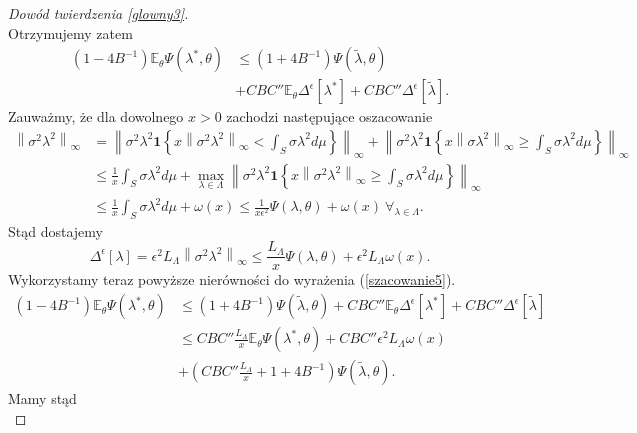 \documentclass[man,mfiu]{mgrwms}
\newcommand{\norm}[1]{\left\lVert#1\right\rVert}
\begin{document}
\begin{proof}[Dowód twierdzenia \ref{glowny3}]
\begin{displaymath}
\end{displaymath}
Otrzymujemy zatem
\begin{equation}\label{szacowanie5}
\begin{split}
(1-4B^{-1})\mathbb{E}_{\theta}\Psi(\lambda^*,\theta)&\leq (1+4B^{-1})\Psi(\tilde{\lambda},\theta) \\
&+CBC''\mathbb{E}_{\theta}\Delta^{\epsilon}[\lambda^*]+CBC''\Delta^{\epsilon}[\tilde{\lambda}].
\end{split}
\end{equation}
Zauważmy, że dla dowolnego $x>0$ zachodzi następujące oszacowanie
\begin{displaymath}
\begin{split}
\norm{\sigma^2\lambda^2}_{\infty}&=\norm{\sigma^2\lambda^2\pmb{1}\left\{x\norm{\sigma^2\lambda^2}_{\infty}<\int_S\sigma\lambda^2 d\mu\right\}}_{\infty}+\norm{\sigma^2\lambda^2\pmb{1}\left\{x\norm{\sigma\lambda^2}_{\infty}\geq \int_S\sigma\lambda^2 d\mu\right\}}_{\infty}\\
&\leq \frac{1}{x}\int_S\sigma\lambda^2 d\mu+\max_{\lambda\in \Lambda}\norm{\sigma^2\lambda^2\pmb{1}\left\{x\norm{\sigma^2\lambda^2}_{\infty}\geq \int_S\sigma\lambda^2 d\mu\right\}}_{\infty}\\
&\leq \frac{1}{x}\int_S\sigma\lambda^2 d\mu+\omega (x)\leq \frac{1}{x\epsilon^2}\Psi(\lambda,\theta)+\omega (x)\ \forall_{\lambda\in \Lambda}.
\end{split}
\end{displaymath}
Stąd dostajemy 
\begin{displaymath}
\Delta^{\epsilon}[\lambda]=\epsilon^2 L_{\Lambda}\norm{\sigma^2\lambda^2}_{\infty}\leq \frac{L_{\Lambda}}{x}\Psi(\lambda,\theta)+\epsilon^2L_{\Lambda}\omega (x).
\end{displaymath}
Wykorzystamy teraz powyższe nierówności do wyrażenia (\ref{szacowanie5}).
\begin{displaymath}
\begin{split}
(1-4B^{-1})\mathbb{E}_{\theta}\Psi(\lambda^*,\theta)&\leq (1+4B^{-1})\Psi(\tilde{\lambda},\theta)+CBC''\mathbb{E}_{\theta}\Delta^{\epsilon}[\lambda^*]+CBC''\Delta^{\epsilon}[\tilde{\lambda}]\\
&\leq CBC''\frac{L_{\Lambda}}{x}\mathbb{E}_{\theta}\Psi(\lambda^*,\theta)+CBC''\epsilon^2L_{\Lambda}\omega (x)\\&+\left(CBC''\frac{L_{\Lambda}}{x}+1+4B^{-1}\right)\Psi(\tilde{\lambda},\theta).
\end{split}
\end{displaymath}
Mamy stąd
\begin{displaymath}

\end{displaymath}
\end{proof}
\end{document}
